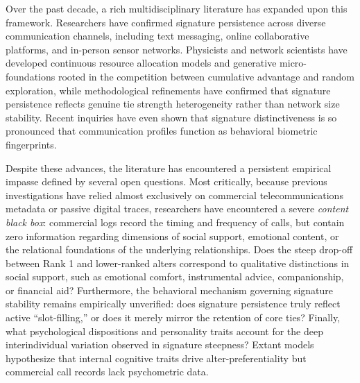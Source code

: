 \documentclass[11pt,letterpaper]{article}
\begin{document}
Over the past decade, a rich multidisciplinary literature has expanded upon this framework. Researchers have confirmed signature persistence across diverse communication channels, including text messaging,\cite{heydari2018multichannel} online collaborative platforms,\cite{li2018social,koltsova2021social} and in-person sensor networks.\cite{li2022evidence,adel2026preferentiality} Physicists and network scientists have developed continuous resource allocation models\cite{tamarit2022beyond} and generative micro-foundations rooted in the competition between cumulative advantage and random exploration,\cite{iniguez2023universal} while methodological refinements have confirmed that signature persistence reflects genuine tie strength heterogeneity rather than network size stability.\cite{heydari2024disentangling,heydari2024dynamic} Recent inquiries have even shown that signature distinctiveness is so pronounced that communication profiles function as behavioral biometric fingerprints.\cite{jia2025multidimensional}

Despite these advances, the literature has encountered a persistent empirical impasse defined by several open questions. Most critically, because previous investigations have relied almost exclusively on commercial telecommunications metadata or passive digital traces,\cite{saramaeki2014persistence,heydari2018multichannel,iniguez2023universal} researchers have encountered a severe \textit{content black box}: commercial logs record the timing and frequency of calls, but contain zero information regarding dimensions of social support, emotional content, or the relational foundations of the underlying relationships.\cite{burt1985relation,wellman1990different-b11} Does the steep drop-off between Rank 1 and lower-ranked alters correspond to qualitative distinctions in social support, such as emotional comfort, instrumental advice, companionship, or financial aid? Furthermore, the behavioral mechanism governing signature stability remains empirically unverified: does signature persistence truly reflect active ``slot-filling,'' or does it merely mirror the retention of core ties? Finally, what psychological dispositions and personality traits account for the deep interindividual variation observed in signature steepness? Extant models hypothesize that internal cognitive traits drive alter-preferentiality \cite{dunbar2018anatomy,iniguez2023universal} but commercial call records lack psychometric data.
\end{document}
